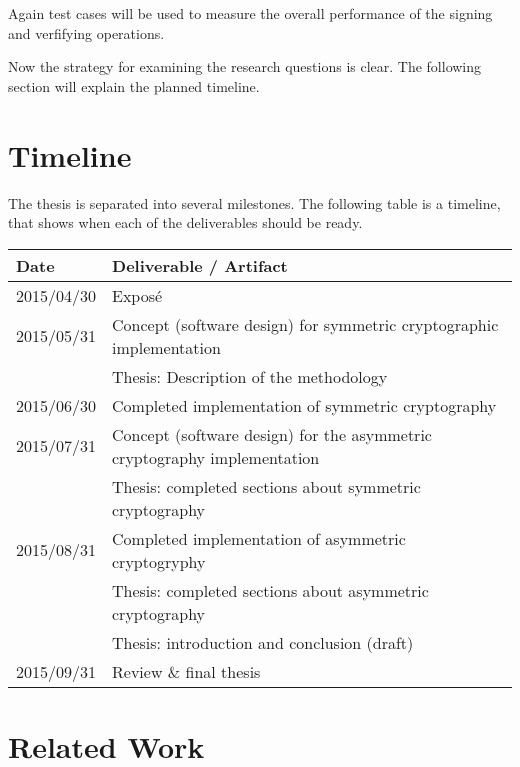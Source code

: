 \documentclass[a4paper,12pt]{article}
\begin{document}
Again test cases will be used to measure the overall performance of the signing and verfifying operations.

Now the strategy for examining the research questions is clear. The following section will explain the planned timeline.

\section{Timeline}

The thesis is separated into several milestones. The following table is a timeline, that shows when each of the deliverables should be ready.

\begin{table}[h]
\begin{tabular}{ll}
\textbf{Date} & \textbf{Deliverable / Artifact}                                           \\ \hline
2015/04/30    & Exposé                                                                    \\ \hline
2015/05/31    & Concept (software design) for symmetric cryptographic implementation      \\
              & Thesis: Description of the methodology                                    \\ \hline
2015/06/30    & Completed implementation of symmetric cryptography                        \\ \hline
2015/07/31    & Concept (software design)  for the asymmetric cryptography implementation \\
              & Thesis: completed sections about symmetric cryptography                   \\ \hline
2015/08/31    & Completed implementation of asymmetric cryptogryphy                       \\
              & Thesis: completed sections about asymmetric cryptography                  \\
              & Thesis: introduction and conclusion (draft)                               \\ \hline
2015/09/31    & Review \& final thesis                                                   
\end{tabular}
\end{table}

\section{Related Work}

\begingroup
\renewcommand{\section}[2]{}
\renewcommand{\refname}{}
\nocite{*}


\endgroup
\end{document}
